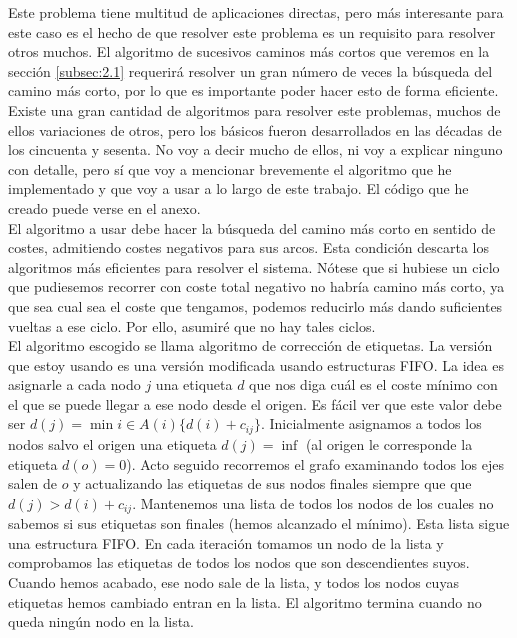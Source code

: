 Este problema tiene multitud de aplicaciones directas, pero más interesante para este caso es el hecho de que resolver este problema es un requisito para resolver otros muchos.
El algoritmo de sucesivos caminos más cortos que veremos en la sección \ref{subsec:2.1} requerirá resolver un gran número de veces la búsqueda del camino más corto, por lo que es importante poder hacer esto de forma eficiente.\\

Existe una gran cantidad de algoritmos para resolver este problemas, muchos de ellos variaciones de otros, pero los básicos fueron desarrollados en las décadas de los cincuenta y sesenta.
No voy a decir mucho de ellos, ni voy a explicar ninguno con detalle, pero sí que voy a mencionar brevemente el algoritmo que he implementado y que voy a usar a lo largo de este trabajo.
El código que he creado puede verse en el anexo.\\

El algoritmo a usar debe hacer la búsqueda del camino más corto en sentido de costes, admitiendo costes negativos para sus arcos.
Esta condición descarta los algoritmos más eficientes para resolver el sistema.
Nótese que si hubiese un ciclo que pudiesemos recorrer con coste total negativo no habría camino más corto, ya que sea cual sea el coste que tengamos, podemos reducirlo más dando suficientes vueltas a ese ciclo.
Por ello, asumiré que no hay tales ciclos.\\

El algoritmo escogido se llama algoritmo de corrección de etiquetas.
La versión que estoy usando es una versión modificada usando estructuras FIFO.
La idea es asignarle a cada nodo $j$ una etiqueta $d$ que nos diga cuál es el coste mínimo con el que se puede llegar a ese nodo desde el origen.
Es fácil ver que este valor debe ser $d(j)=\min\limits{i \in A(i)}\{d(i)+c_{ij}\}$.
Inicialmente asignamos a todos los nodos salvo el origen una etiqueta $d(j)=\inf$ (al origen le corresponde la etiqueta $d(o)=0$).
Acto seguido recorremos el grafo examinando todos los ejes salen de $o$ y actualizando las etiquetas de sus nodos finales siempre que que $d(j) > d(i)+c_{ij}$.
Mantenemos una lista de todos los nodos de los cuales no sabemos si sus etiquetas son finales (hemos alcanzado el mínimo).
Esta lista sigue una estructura FIFO.
En cada iteración tomamos un nodo de la lista y comprobamos las etiquetas de todos los nodos que son descendientes suyos.
Cuando hemos acabado, ese nodo sale de la lista,  y todos los nodos cuyas etiquetas hemos cambiado entran en la lista.
El algoritmo termina cuando no queda ningún nodo en la lista.\\

